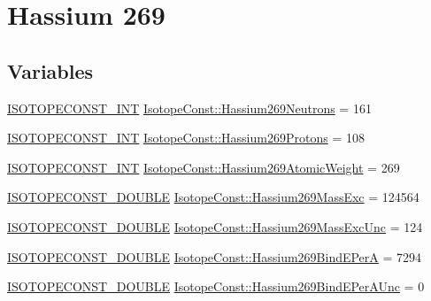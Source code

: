 \hypertarget{group___isotope_const-_hassium-_hs269}{}\section{Hassium 269}
\label{group___isotope_const-_hassium-_hs269}
\subsection*{Variables}
\begin{DoxyCompactItemize}
\item 
\mbox{\hyperlink{group___isotope_const-_macros_ga5f18360b3e99483a35c32d789e62621c}{I\+S\+O\+T\+O\+P\+E\+C\+O\+N\+S\+T\+\_\+\+I\+NT}} \mbox{\hyperlink{group___isotope_const-_hassium-_hs269_ga33589eab560cc48e23fbffe1baa4f45c}{Isotope\+Const\+::\+Hassium269\+Neutrons}} = 161
\item 
\mbox{\hyperlink{group___isotope_const-_macros_ga5f18360b3e99483a35c32d789e62621c}{I\+S\+O\+T\+O\+P\+E\+C\+O\+N\+S\+T\+\_\+\+I\+NT}} \mbox{\hyperlink{group___isotope_const-_hassium-_hs269_gadf0bbccbc6d07e5192ebd66795e74e20}{Isotope\+Const\+::\+Hassium269\+Protons}} = 108
\item 
\mbox{\hyperlink{group___isotope_const-_macros_ga5f18360b3e99483a35c32d789e62621c}{I\+S\+O\+T\+O\+P\+E\+C\+O\+N\+S\+T\+\_\+\+I\+NT}} \mbox{\hyperlink{group___isotope_const-_hassium-_hs269_gace697fbf132c063e1e079745d4ed418c}{Isotope\+Const\+::\+Hassium269\+Atomic\+Weight}} = 269
\item 
\mbox{\hyperlink{group___isotope_const-_macros_ga8f45a7272ce02c0b4c65c44636ed719a}{I\+S\+O\+T\+O\+P\+E\+C\+O\+N\+S\+T\+\_\+\+D\+O\+U\+B\+LE}} \mbox{\hyperlink{group___isotope_const-_hassium-_hs269_gac325ceee24fec22458fd9e1a2a8908b4}{Isotope\+Const\+::\+Hassium269\+Mass\+Exc}} = 124564
\item 
\mbox{\hyperlink{group___isotope_const-_macros_ga8f45a7272ce02c0b4c65c44636ed719a}{I\+S\+O\+T\+O\+P\+E\+C\+O\+N\+S\+T\+\_\+\+D\+O\+U\+B\+LE}} \mbox{\hyperlink{group___isotope_const-_hassium-_hs269_ga427332ceebbdcfbc2c40d7388d9fa4cd}{Isotope\+Const\+::\+Hassium269\+Mass\+Exc\+Unc}} = 124
\item 
\mbox{\hyperlink{group___isotope_const-_macros_ga8f45a7272ce02c0b4c65c44636ed719a}{I\+S\+O\+T\+O\+P\+E\+C\+O\+N\+S\+T\+\_\+\+D\+O\+U\+B\+LE}} \mbox{\hyperlink{group___isotope_const-_hassium-_hs269_gabb440834d030a7a68fc2197a9f86c353}{Isotope\+Const\+::\+Hassium269\+Bind\+E\+PerA}} = 7294
\item 
\mbox{\hyperlink{group___isotope_const-_macros_ga8f45a7272ce02c0b4c65c44636ed719a}{I\+S\+O\+T\+O\+P\+E\+C\+O\+N\+S\+T\+\_\+\+D\+O\+U\+B\+LE}} \mbox{\hyperlink{group___isotope_const-_hassium-_hs269_ga3b797a4c35166fdf270f8ff15d3e8c74}{Isotope\+Const\+::\+Hassium269\+Bind\+E\+Per\+A\+Unc}} = 0

\end{DoxyCompactItemize}
